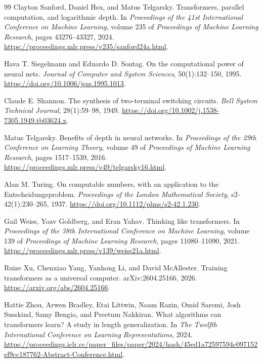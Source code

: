 \documentclass[11pt,twoside]{article}
\theoremstyle{definition}
\theoremstyle{remark}
\begin{document}
\begin{thebibliography}{99}
Clayton Sanford, Daniel Hsu, and Matus Telgarsky.
\newblock Transformers, parallel computation, and logarithmic depth.
\newblock In \emph{Proceedings of the 41st International Conference on
Machine Learning}, volume 235 of \emph{Proceedings of Machine Learning
Research}, pages 43276--43327, 2024.
\newblock \url{https://proceedings.mlr.press/v235/sanford24a.html}.

Hava T. Siegelmann and Eduardo D. Sontag.
\newblock On the computational power of neural nets.
\newblock \emph{Journal of Computer and System Sciences}, 50(1):132--150,
1995.
\newblock \url{https://doi.org/10.1006/jcss.1995.1013}.

Claude E. Shannon.
\newblock The synthesis of two-terminal switching circuits.
\newblock \emph{Bell System Technical Journal}, 28(1):59--98, 1949.
\newblock \url{https://doi.org/10.1002/j.1538-7305.1949.tb03624.x}.

Matus Telgarsky.
\newblock Benefits of depth in neural networks.
\newblock In \emph{Proceedings of the 29th Conference on Learning Theory},
volume 49 of \emph{Proceedings of Machine Learning Research}, pages
1517--1539, 2016.
\newblock \url{https://proceedings.mlr.press/v49/telgarsky16.html}.

Alan M. Turing.
\newblock On computable numbers, with an application to the
Entscheidungsproblem.
\newblock \emph{Proceedings of the London Mathematical Society},
s2-42(1):230--265, 1937.
\newblock \url{https://doi.org/10.1112/plms/s2-42.1.230}.

Gail Weiss, Yoav Goldberg, and Eran Yahav.
\newblock Thinking like transformers.
\newblock In \emph{Proceedings of the 38th International Conference on
Machine Learning}, volume 139 of \emph{Proceedings of Machine Learning
Research}, pages 11080--11090, 2021.
\newblock \url{https://proceedings.mlr.press/v139/weiss21a.html}.

Ruize Xu, Chenxiao Yang, Yanhong Li, and David McAllester.
\newblock Training transformers as a universal computer.
\newblock arXiv:2604.25166, 2026.
\newblock \url{https://arxiv.org/abs/2604.25166}.

Hattie Zhou, Arwen Bradley, Etai Littwin, Noam Razin, Omid Saremi,
Josh Susskind, Samy Bengio, and Preetum Nakkiran.
\newblock What algorithms can transformers learn? A study in length
generalization.
\newblock In \emph{The Twelfth International Conference on Learning
Representations}, 2024.
\newblock \url{https://proceedings.iclr.cc/paper_files/paper/2024/hash/45ed1a72597594c097152ef9cc187762-Abstract-Conference.html}.

\end{thebibliography}
\end{document}
